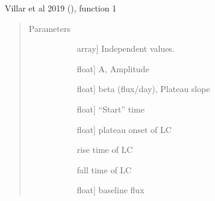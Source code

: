 \documentclass[letterpaper,10pt,english]{sphinxmanual}
\begin{document}
\begin{fulllineitems}
\label{\detokenize{generated/sdapy.models.villar.villar:sdapy.models.villar.villar}}
Villar et al 2019 (), function 1
\begin{quote}\begin{description}
\item[{Parameters}] \leavevmode\begin{description}
\item[{}] \leavevmode{[}array{]}
Independent values.

\item[{}] \leavevmode{[}float{]}
A, Amplitude

\item[{}] \leavevmode{[}float{]}
beta (flux/day), Plateau slope

\item[{}] \leavevmode{[}float{]}
“Start” time

\item[{}] \leavevmode{[}float{]}
plateau onset of LC

\item[{}] \leavevmode
rise time of LC

\item[{}] \leavevmode
fall time of LC

\item[{}] \leavevmode{[}float{]}
baseline flux

\end{description}

\end{description}\end{quote}

\end{fulllineitems}


\end{document}
